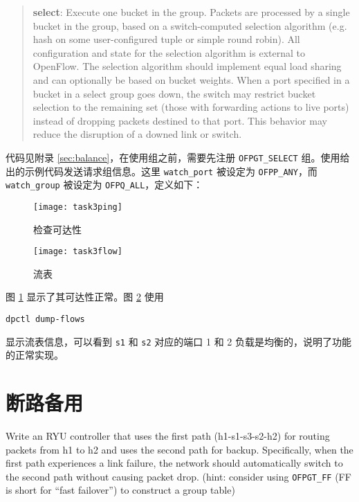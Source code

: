 \begin{quotation}
    \textbf{select}: Execute one bucket in the group. Packets are processed by a single bucket in the
group, based on a switch-computed selection algorithm (e.g. hash on some user-configured tuple or
simple round robin). All configuration and state for the selection algorithm is external to OpenFlow.
The selection algorithm should implement equal load sharing and can optionally be based on bucket
weights. When a port specified in a bucket in a select group goes down, the switch may restrict bucket
selection to the remaining set (those with forwarding actions to live ports) instead of dropping packets
destined to that port. This behavior may reduce the disruption of a downed link or switch.\cite{openflow13}
\end{quotation}

    代码见附录 \ref{sec:balance}，在使用组之前，需要先注册 \verb"OFPGT_SELECT" 组。使用给出的示例代码发送请求组信息。这里 \verb"watch_port" 被设定为 \verb"OFPP_ANY"，而 \verb"watch_group" 被设定为 \verb"OFPQ_ALL"\cite{balance}，定义如下：


    \begin{figure}[H]
        \centering
        \texttt{[image: task3ping]}
        \caption{检查可达性}\label{fig:task3ping}
    \end{figure}

    \begin{figure}[H]
        \centering
        \texttt{[image: task3flow]}
        \caption{流表}\label{fig:task3flow}
    \end{figure}

    图 \ref{fig:task3ping} 显示了其可达性正常。图 \ref{fig:task3flow} 使用
    \begin{lstlisting}[style=commandshell]
    dpctl dump-flows\end{lstlisting}
    显示流表信息，可以看到 \verb"s1" 和 \verb"s2" 对应的端口 1 和 2 负载是均衡的，说明了功能的正常实现。

    \section{断路备用}
    Write an RYU controller that uses the first path (h1-s1-s3-s2-h2) for routing packets from h1 to h2 and uses the second path for backup. Specifically, when the first path experiences a link failure, the network should automatically switch to the second path without causing packet drop. (hint: consider using \verb"OFPGT_FF" (FF is short for ``fast failover'') to construct a group table)

